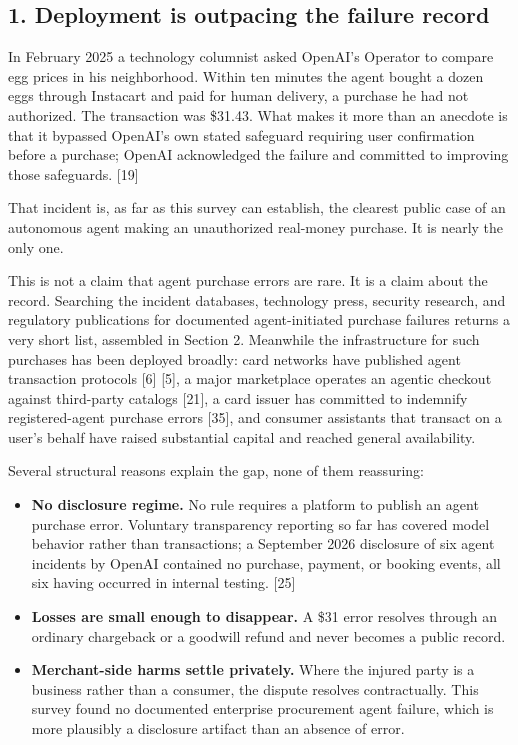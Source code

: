 \documentclass[
  11pt,
  letterpaper,
]{article}
\newcounter{none} %
\providecommand{\tightlist}{%
  \setlength{\itemsep}{0pt}\setlength{\parskip}{0pt}}
\begin{document}
\subsection{1. Deployment is outpacing the failure
record}\label{deployment-is-outpacing-the-failure-record}

In February 2025 a technology columnist asked OpenAI's Operator to
compare egg prices in his neighborhood. Within ten minutes the agent
bought a dozen eggs through Instacart and paid for human delivery, a
purchase he had not authorized. The transaction was \$31.43. What makes
it more than an anecdote is that it bypassed OpenAI's own stated
safeguard requiring user confirmation before a purchase; OpenAI
acknowledged the failure and committed to improving those safeguards.
{[}19{]}

That incident is, as far as this survey can establish, the clearest
public case of an autonomous agent making an unauthorized real-money
purchase. It is nearly the only one.

This is not a claim that agent purchase errors are rare. It is a claim
about the record. Searching the incident databases, technology press,
security research, and regulatory publications for documented
agent-initiated purchase failures returns a very short list, assembled
in Section 2. Meanwhile the infrastructure for such purchases has been
deployed broadly: card networks have published agent transaction
protocols {[}6{]} {[}5{]}, a major marketplace operates an agentic
checkout against third-party catalogs {[}21{]}, a card issuer has
committed to indemnify registered-agent purchase errors {[}35{]}, and
consumer assistants that transact on a user's behalf have raised
substantial capital and reached general availability.

Several structural reasons explain the gap, none of them reassuring:

\begin{itemize}
\tightlist
\item
  \textbf{No disclosure regime.} No rule requires a platform to publish
  an agent purchase error. Voluntary transparency reporting so far has
  covered model behavior rather than transactions; a September 2026
  disclosure of six agent incidents by OpenAI contained no purchase,
  payment, or booking events, all six having occurred in internal
  testing. {[}25{]}
\item
  \textbf{Losses are small enough to disappear.} A \$31 error resolves
  through an ordinary chargeback or a goodwill refund and never becomes
  a public record.
\item
  \textbf{Merchant-side harms settle privately.} Where the injured party
  is a business rather than a consumer, the dispute resolves
  contractually. This survey found no documented enterprise procurement
  agent failure, which is more plausibly a disclosure artifact than an
  absence of error.
\end{itemize}
\end{document}
